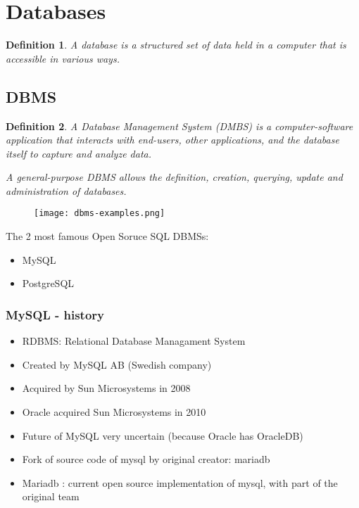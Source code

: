 \documentclass{article}
\newtheorem{theorem}{Definition}[section]
\begin{document}
\section{Databases}

\begin{theorem}
    A database is a structured set of data held in a computer that is accessible in various ways.
\end{theorem}

\subsection{DBMS}

\begin{theorem}
    A Database Management System (DMBS) is a computer-software application that interacts with end-users, 
    other applications, and the database itself to capture and analyze data.

    A general-purpose DBMS allows the definition, creation, querying, update and administration of databases.
\end{theorem}

\begin{figure}[H]
    \centering
    \texttt{[image: dbms-examples.png]}
    \caption{}
\end{figure}

The 2 most famous Open Soruce SQL DBMSs:

\begin{itemize}
    \item MySQL
    \item PostgreSQL
\end{itemize}

\subsubsection{MySQL - history}

\begin{itemize}
    \item RDBMS: Relational Database Managament System
    \item Created by MySQL AB (Swedish company)
    \item Acquired by Sun Microsystems in 2008
    \item Oracle acquired Sun Microsystems in 2010
    \item Future of MySQL very uncertain (because Oracle has OracleDB)
    \item Fork of source code of mysql by original creator: mariadb
    \item Mariadb : current open source implementation of mysql, with part of the original team
\end{itemize}
\end{document}
